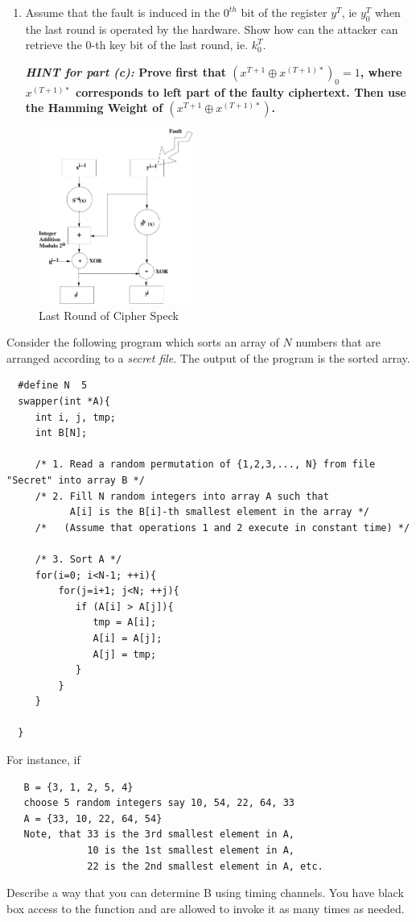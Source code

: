 \documentclass{article}
\begin{document}
\begin{questions}
\begin{enumerate}
\item Assume that the fault is induced in the $0^{th}$ bit 
of the register $y^T$, ie $y_0^T$ when the last 
round is operated by the hardware. Show how can the attacker can retrieve the 
$0$-th key bit of the last round, ie. $k_0^T$. 

{\bf {\em HINT for part (c): } Prove first that $(x^{T+1} \oplus x^{(T+1)*})_0=1$, where $x^{(T+1)*}$ corresponds to 
left part of the faulty ciphertext. Then use the Hamming Weight of  
$(x^{T+1} \oplus x^{(T+1)*})$.}
\end{enumerate}


\begin{figure}[h]
\centering
\includegraphics[width=2in]{Speck}
\caption{Last Round of Cipher Speck}
\label{Speck}
\end{figure}

\question Consider the following program which sorts an array of $N$ numbers that are  
arranged according to a {\em secret file}. The output of the program is the sorted array. 
\begin{verbatim}
  #define N  5
  swapper(int *A){
     int i, j, tmp;
     int B[N];

     /* 1. Read a random permutation of {1,2,3,..., N} from file "Secret" into array B */
     /* 2. Fill N random integers into array A such that 
           A[i] is the B[i]-th smallest element in the array */
     /*   (Assume that operations 1 and 2 execute in constant time) */

     /* 3. Sort A */
     for(i=0; i<N-1; ++i){
         for(j=i+1; j<N; ++j){
            if (A[i] > A[j]){
               tmp = A[i];
               A[i] = A[j];
               A[j] = tmp;
            }
         }
     }
  
  }
\end{verbatim}

For instance, if 
\begin{verbatim}
   B = {3, 1, 2, 5, 4}
   choose 5 random integers say 10, 54, 22, 64, 33
   A = {33, 10, 22, 64, 54}
   Note, that 33 is the 3rd smallest element in A, 
              10 is the 1st smallest element in A,
              22 is the 2nd smallest element in A, etc.
\end{verbatim}
Describe a way that you can determine B using timing channels.
You have black box access to the function and are allowed to invoke it as many times as needed. \\


\end{questions}
\end{document}
